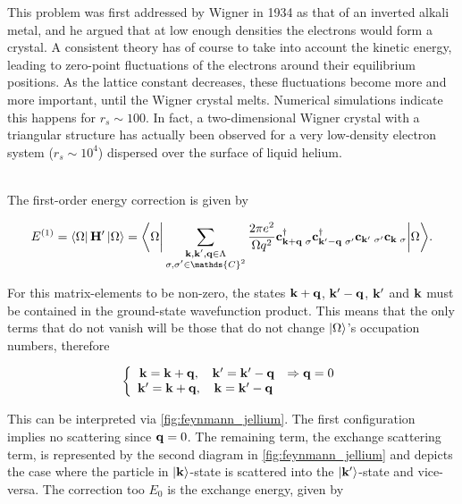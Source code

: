 \begin{tcolorbox}[colback = LimeGreen, title = Historical Context]

This problem was first addressed by Wigner in 1934 as that of an inverted alkali metal, and he argued that at low enough densities the electrons would form a crystal. A consistent theory has of course to take into account the kinetic energy, leading to zero-point fluctuations of the electrons around their equilibrium positions. As the lattice constant decreases, these fluctuations become more and more important, until the Wigner crystal melts. Numerical simulations indicate this happens for $r_s \sim 100$. In fact, a two-dimensional Wigner crystal with a triangular structure has actually been observed for a very low-density electron system ($r_s\sim 10^4$) dispersed over the surface of liquid helium. 

\end{tcolorbox}

\blanky \\

The first-order energy correction is given by 

$$
    E^{(1)} = \bra{\Omega} {{\bf H}}' \ket{\Omega} = \bigg \langle {\Omega} \bigg|  \sum_{\substack{{\bf k},{\bf k}',{\bf q} \in \Lambda\\
    \sigma, \sigma' \in \mathds{C}^2}} \frac{2\pi e^2}{\Omega q^2} {\bf c}_{{\bf k}+{\bf q} \blanky \sigma}^\dagger {\bf c}_{{\bf k}'-{\bf q} \blanky \sigma'}^\dagger {\bf c}_{{\bf k}' \blanky \sigma'} {\bf c}_{{\bf k} \blanky \sigma} \bigg| {\Omega} \bigg \rangle.
$$

For this matrix-elements to be non-zero, the states ${\bf k}+{\bf q}$, ${\bf k}'-{\bf q}$, ${\bf k}'$ and ${\bf k}$ must be contained in the ground-state wavefunction product. This means that the only terms that do not vanish will be those that do not change $\ket{\Omega}$'s occupation numbers, therefore

\begin{equation}
    \left\{\begin{array}{ccc}
        {\bf k} = {\bf k} + {\bf q,} & {\bf k}' = {\bf k}' - {\bf q} & \Rightarrow {\bf q} = 0 \\
        {\bf k}' = {\bf k} + {\bf q}, & {\bf k} = {\bf k}' - {\bf q}
    \end{array} \right.
\end{equation}

This can be interpreted via \cref{fig:feynmann_jellium}. The first configuration implies no scattering since ${\bf q} = 0$. The remaining term, the exchange scattering term, is represented by the second diagram in \cref{fig:feynmann_jellium} and depicts the case where the particle in $\ket{{\bf k}}$-state is scattered into the $\ket{{\bf k}'}$-state and vice-versa. The correction too $E_0$ is the exchange energy, given by 

